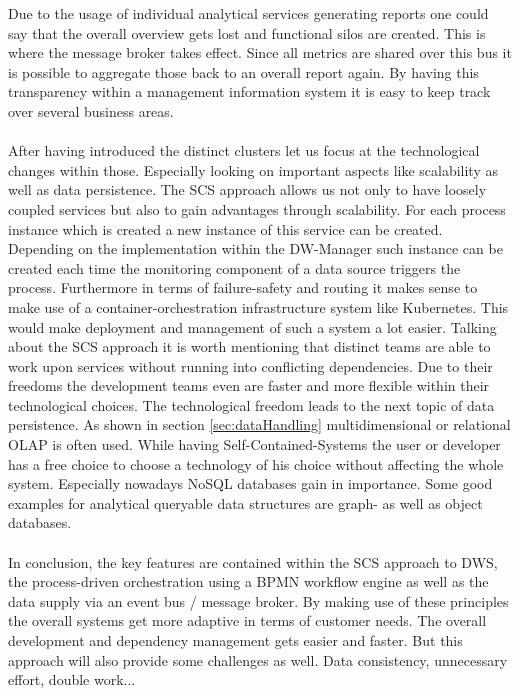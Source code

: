 Due to the usage of individual analytical services generating reports one could say that the overall overview gets lost and functional silos are created. This is where the message broker takes effect. Since all metrics are shared over this bus it is possible to aggregate those back to an overall report again. By having this transparency within a management information system it is easy to keep track over several business areas. \newline
\\
\\
After having introduced the distinct clusters let us focus at the technological changes within those. Especially looking on important aspects like scalability as well as data persistence.\newline
The SCS approach allows us not only to have loosely coupled services but also to gain advantages through scalability. For each process instance which is created a new instance of this service can be created. Depending on the implementation within the DW-Manager such instance can be created each time the monitoring component of a data source triggers the process. Furthermore in terms of failure-safety and routing it makes sense to make use of a container-orchestration infrastructure system like Kubernetes. This would make deployment and management of such a system a lot easier.\newline 
Talking about the SCS approach it is worth mentioning that distinct teams are able to work upon services without running into conflicting dependencies. Due to their freedoms the development teams even are faster and more flexible within their technological choices.\newline
The technological freedom leads to the next topic of data persistence. As shown in section \ref{sec:dataHandling} multidimensional or relational OLAP is often used. While having Self-Contained-Systems the user or developer has a free choice to choose a technology of his choice without affecting the whole system. Especially nowadays NoSQL databases gain in importance. Some good examples for analytical queryable data structures are graph- as well as object databases. 
\\
\\
In conclusion, the key features are contained within the SCS approach to DWS, the process-driven orchestration using a BPMN workflow engine as well as the data supply via an event bus / message broker. By making use of these principles the overall systems get more adaptive in terms of customer needs. The overall development and dependency management gets easier and faster. \newline
But this approach will also provide some challenges as well. Data consistency, unnecessary effort, double work...

